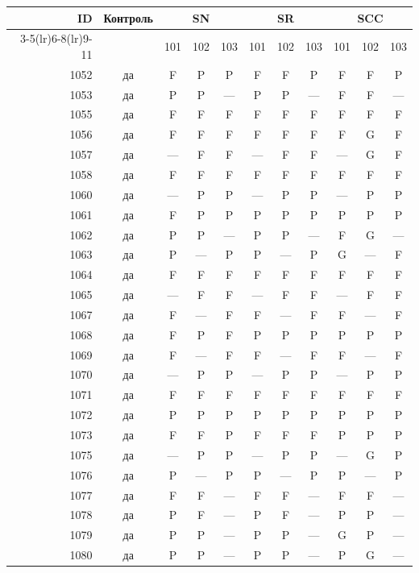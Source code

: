 \begin{table}[p]\centering\small
\begin{tabular*}{\textwidth}{@{\extracolsep{\fill}}rc*{9}{c}@{}}\toprule
ID & Контроль & \multicolumn{3}{c}{SN} & \multicolumn{3}{c}{SR} & \multicolumn{3}{c}{SCC}\\
\cmidrule(lr){3-5}\cmidrule(lr){6-8}\cmidrule(lr){9-11}
 & & 101 & 102 & 103 & 101 & 102 & 103 & 101 & 102 & 103\\\midrule
1052 & да & F & P & P & F & F & P & F & F & P\\
1053 & да & P & P & — & P & P & — & F & F & —\\
1055 & да & F & F & F & F & F & F & F & F & F\\
1056 & да & F & F & F & F & F & F & F & G & F\\
1057 & да & — & F & F & — & F & F & — & G & F\\
1058 & да & F & F & F & F & F & F & F & F & F\\
1060 & да & — & P & P & — & P & P & — & P & P\\
1061 & да & F & P & P & P & P & P & P & P & P\\
1062 & да & P & P & — & P & P & — & F & G & —\\
1063 & да & P & — & P & P & — & P & G & — & F\\
1064 & да & F & F & F & F & F & F & F & F & F\\
1065 & да & — & F & F & — & F & F & — & F & F\\
1067 & да & F & — & F & F & — & F & F & — & F\\
1068 & да & F & P & F & P & P & P & P & P & P\\
1069 & да & F & — & F & F & — & F & F & — & F\\
1070 & да & — & P & P & — & P & P & — & P & P\\
1071 & да & F & F & F & F & F & F & F & F & F\\
1072 & да & P & P & P & P & P & P & P & P & P\\
1073 & да & F & F & P & F & F & F & P & P & P\\
1075 & да & — & P & P & — & P & P & — & G & P\\
1076 & да & P & — & P & P & — & P & P & — & P\\
1077 & да & F & F & — & F & F & — & F & F & —\\
1078 & да & P & F & — & P & F & — & P & P & —\\
1079 & да & P & P & — & P & P & — & G & P & —\\
1080 & да & P & P & — & P & P & — & P & G & —\\

\end{tabular*}
\end{table}
